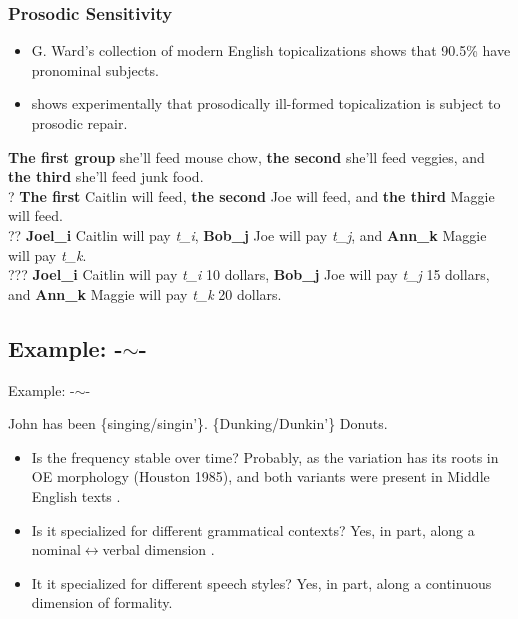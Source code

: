 \documentclass[hyperref={pdfpagelabels=false}]{beamer}
\begin{document}
\begin{frame}
\frametitle{Prosodic Sensitivity}
\begin{itemize}
\item G. Ward's collection of modern English topicalizations shows that 90.5\% have pronominal subjects.
\item \citet{speyer2008, speyer2010} shows experimentally that prosodically ill-formed topicalization is subject to prosodic repair.
\end{itemize}
	\begin{exe}

	\ex  \textbf{The first group} she'll feed mouse chow, \textbf{the second} she'll feed veggies, and \textbf{the third} she'll feed  junk food.\\

	\ex  ? \textbf{The first} Caitlin will feed, \textbf{the second} Joe will feed, and \textbf{the third} Maggie will feed. \\

	\ex  ?? \textbf{Joel_i} Caitlin will pay \textsl{t_i}, \textbf{Bob_j} Joe will pay \textsl{t_j}, and \textbf{Ann_k} Maggie will pay \textsl{t_k}. \\
	
	\ex  ??? \textbf{Joel_i} Caitlin will pay \textsl{t_i} 10 dollars, \textbf{Bob_j} Joe will pay \textsl{t_j} 15 dollars, and \textbf{Ann_k} Maggie will pay \textsl{t_k} 20 dollars. \\

	\end{exe}
	
\end{frame}

\subsection{Example: -$\sim$-}
\begin{frame}{Example: -$\sim$-}
	\begin{exe}
			\ex John has been \{singing/singin'\}.
			\ex \{Dunking/Dunkin'\} Donuts.
	\end{exe}
	\begin{itemize}
		\item Is the frequency stable over time? Probably, as the variation has its roots in OE morphology (Houston 1985), and both variants were present in Middle English texts \citep{labov1989}.
		\item Is it specialized for different grammatical contexts? Yes, in part, along a nominal$\leftrightarrow$verbal dimension \citep{labov1989}.
		\item It it specialized for different speech styles? Yes, in part, along a continuous dimension of formality.
	\end{itemize}


\end{frame}
\end{document}
